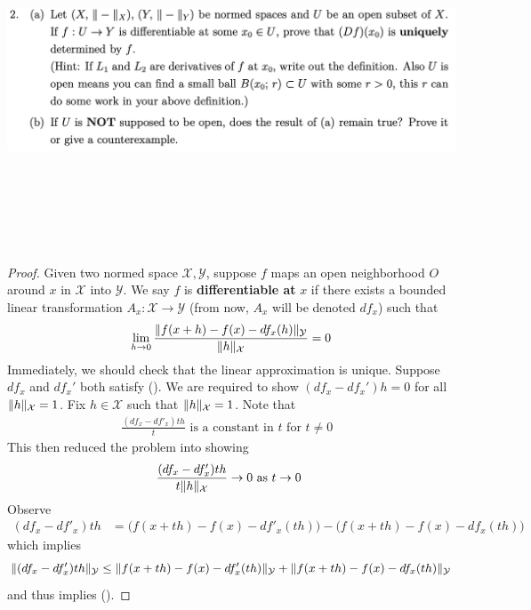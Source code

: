 \documentclass{report}
\begin{document}
\begin{question}{}{}
\includegraphics[height=10cm,width=18cm]{ahw5q2}
\end{question}
\begin{proof}
Given two normed space $\mathcal{X},\mathcal{Y}$, suppose $f$ maps an open neighborhood $O$ around $x$ in $\mathcal{X}$ into $\mathcal{Y}$. We say $f$ is \textbf{differentiable at} $x$ if there exists a bounded linear transformation $A_x:\mathcal{X}\rightarrow \mathcal{Y}$ (from now, $A_x$ will be denoted $df_x$) such that  
\begin{align}
\label{defdi}
  \lim_{h\to 0} \frac{\| f(x+h)-f(x)-df_x(h) \|_\mathcal{Y}}{\| h \|_\mathcal{X}}=0 
\end{align}
Immediately, we should check that the linear approximation is unique. Suppose $df_x$ and  $df_x'$ both satisfy (). We are required to show $(df_x-df_x')h=0$ for all $\| h \|_\mathcal{X}=1$. Fix $h\in \mathcal{X}$ such that $\| h \|_\mathcal{X}=1$. Note that 
\begin{align*}
 \frac{(df_x-df'_x)th}{t}\text{ is a constant in $t$ for $t\neq 0$ }
\end{align*}
This then reduced the problem into showing 
\begin{align}
\label{goaldib}
\frac{(df_x-df'_x)th}{t\| h \|_{\mathcal{X}}}\to 0\text{ as $t\to 0$ }
\end{align}
Observe 
\begin{align*}
  (df_x-df'_x)th&= \Big( f(x+th)-f(x)-df'_x(th)\Big) - \Big(f(x+th)-f(x)-df_x(th) \Big)
\end{align*}
which implies 
\begin{align*}
\| (df_x-df_x')th \|_\mathcal{Y}\leq \| f(x+th)-f(x)-df'_x(th) \|_{\mathcal{Y}}+ \| f(x+th)-f(x)-df_x(th) \|_\mathcal{Y}
\end{align*}
and thus implies ().
\end{proof}
\end{document}
